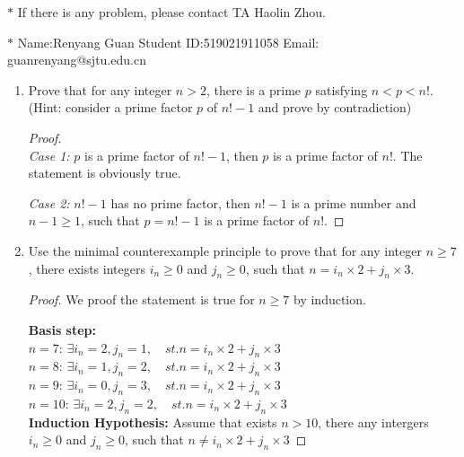 \documentclass[12pt,a4paper]{article}
\theoremstyle{definition}
\begin{document}
\noindent

\noindent{}
\begin{center}
\footnotesize{\color{red}$*$ If there is any problem, please contact TA Haolin Zhou.}

\footnotesize{\color{blue}$*$ Name:Renyang Guan  \quad Student ID:519021911058 \quad Email: guanrenyang@sjtu.edu.cn}
\end{center}

\begin{enumerate}
    \item
    Prove that for any integer $n>2$, there is a prime $p$ satisfying $n<p<n!$. {\color{blue}(Hint: consider a prime factor $p$ of $n!-1$ and prove by contradiction)}
    \begin{proof}
    ~\\
    \textit{Case 1:} $p$ is a prime factor of $n!-1$, then $p$ is a prime factor of $n!$. The statement is obviously true.  
    
	\textit{Case 2:} $n!-1$ has no prime factor, then $n!-1$ is a prime number and $n-1 \geq 1$, such that $p=n!-1$ is a prime factor of $n!$.
    \end{proof}

    \item
    Use the minimal counterexample principle to prove that for any integer $n\ge 7$, there exists integers $i_n\ge 0$ and $j_n\ge 0$, such that $n = i_n \times 2 + j_n \times 3$.
    \begin{proof}We proof the statement is true for $n\geq7$ by induction.  
    
    \textbf{Basis step:} 
     ~\\
    $n=7$: $\exists  i_n=2,j_n=1,\quad st. n=i_n\times2 + j_n 	\times 3$ \\
    $n=8$: $\exists  i_n=1,j_n=2,\quad st. n=i_n\times2 + j_n 	\times 3$ \\
    $n=9$: $\exists  i_n=0,j_n=3,\quad st. n=i_n\times2 + j_n 	\times 3$ \\
    $n=10$: $\exists  i_n=2,j_n=2,\quad st. n=i_n\times2 + j_n 	\times 3$ \\
    \textbf{Induction Hypothesis:} Assume that exists $n>10$, there any intergers $i_n\geq 0$ and $j_n\geq 0$, such that $n \neq i_n \times 2+j_n \times 3$  
    

\end{proof}
\end{enumerate}
\end{document}
